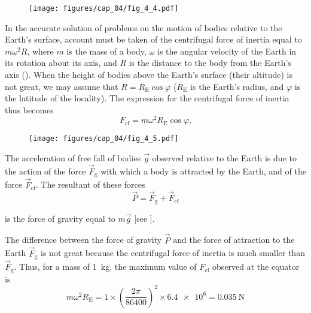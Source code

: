 \begin{figure}[t]
	\begin{center}
		\texttt{[image: figures/cap\_04/fig\_4\_4.pdf]}
		\caption[]{}
		\label{fig:4_4}
	\end{center}
\end{figure}

In the accurate solution of problems on the motion of bodies relative to the Earth's surface, account must be taken of the centrifugal force of inertia equal to $m\omega^2R$, where $m$ is the mass of a body, $\omega$ is the angular velocity of the Earth in its rotation about its axis, and $R$ is the distance to the body from the Earth's axis (). When the height of bodies above the Earth's surface (their altitude) is not great, we may assume that $R=R_{\text{E}}\cos\varphi$ ($R_{\text{E}}$ is the Earth's radius, and $\varphi$ is the latitude of the locality). The expression for the centrifugal force of inertia thus becomes
\begin{equation}\label{eq:4_7}
F_{\text{cf}} = m\omega^2 R_{\text{E}}\cos\varphi.
\end{equation}

\begin{figure}[t]
	\begin{center}
		\texttt{[image: figures/cap\_04/fig\_4\_5.pdf]}
		\caption[]{}
		\label{fig:4_5}
	\end{center}
\end{figure}

The acceleration of free fall of bodies $\vec{g}$ observed relative to the Earth is due to the action of the force $\vec{F}_{\text{g}}$ with which a body is attracted by the Earth, and of the force $\vec{F}_{\text{cf}}$. The resultant of these forces
\begin{equation}\label{eq:4_8}
\vec{P} = \vec{F}_{\text{g}} + \vec{F}_{\text{cf}}
\end{equation}

\noindent
is the force of gravity equal to $m\vec{g}$ [see ].

The difference between the force of gravity $\vec{P}$ and the force of attraction to the Earth $\vec{F}_{\text{g}}$ is not great because the centrifugal force of inertia is much smaller than $\vec{F}_{\text{g}}$. Thus, for a mass of \SI{1}{\kilo\gram}, the maximum value of $F_{\text{cf}}$ observed at the equator is
\begin{equation*}
m\omega^2 R_{\text{E}} = 1 \times \left(\frac{2\pi}{86400}\right)^2 \times \num{6.4e6} = \SI{0.035}{\newton}
\end{equation*}


